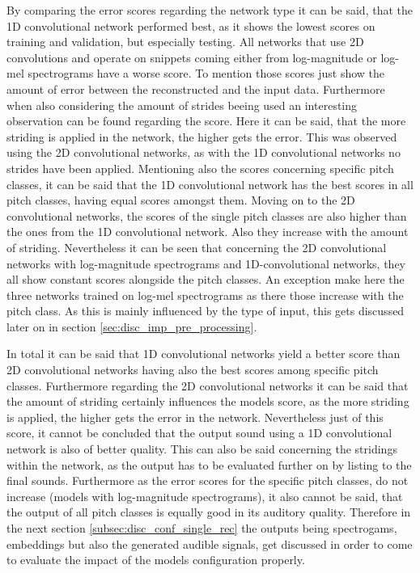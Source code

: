 By comparing the error scores regarding the network type it can be said, that the 1D convolutional network performed best, as it shows the lowest scores on training and validation, but especially testing. All networks that use 2D convolutions and operate on snippets coming either from log-magnitude or log-mel spectrograms have a worse score. To mention those scores just show the amount of error between the reconstructed and the input data. Furthermore when also considering the amount of strides beeing used an interesting observation can be found regarding the score. Here it can be said, that the more striding is applied in the network, the higher gets the error. This was observed using the 2D convolutional networks, as with the 1D convolutional networks no strides have been applied. Mentioning also the scores concerning specific pitch classes, it can be said that the 1D convolutional network has the best scores in all pitch classes, having equal scores amongst them. Moving on to the 2D convolutional networks, the scores of the single pitch classes are also higher than the ones from the 1D convolutional network. Also they increase with the amount of striding. Nevertheless it can be seen that concerning the 2D convolutional networks with log-magnitude spectrograms and 1D-convolutional networks, they all show constant scores alongside the pitch classes. An exception make here the three networks trained on log-mel spectrograms as there those increase with the pitch class. As this is mainly influenced by the type of input, this gets discussed later on in section \ref{sec:disc_imp_pre_processing}. 

In total it can be said that 1D convolutional networks yield a better score than 2D convolutional networks having also the best scores among specific pitch classes. Furthermore regarding the 2D convolutional networks it can be said that the amount of striding certainly influences the models score, as the more striding is applied, the higher gets the error in the network. Nevertheless just of this score, it cannot be concluded that the output sound using a 1D convolutional network is also of better quality. This can also be said concerning the stridings within the network, as the output has to be evaluated further on by listing to the final sounds. Furthermore as the error scores for the specific pitch classes, do not increase (models with log-magnitude spectrograms), it also cannot be said, that the output of all pitch classes is equally good in its auditory quality. Therefore in the next section \ref{subsec:disc_conf_single_rec} the outputs being spectrogams, embeddings but also the generated audible signals, get discussed in order to come to evaluate the impact of the models configuration properly.


